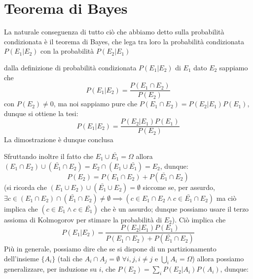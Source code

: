 \documentclass{report}
\begin{document}
\section{Teorema di Bayes}
La naturale conseguenza di tutto ciò che abbiamo detto sulla probabilità condizionata è il teorema di Bayes, che lega tra loro la probabilità condizionata $P(E_1 | E_2)$ con la probabilità $P(E_2 | E_1)$
\begin{myproof}
	dalla definizione di probabilità condizionata $P(E_1 | E_2)$ di $E_1$ dato $E_2$ sappiamo che
	$$
		P(E_1 | E_2) = \frac{P(E_1 \cap E_2)}{P(E_2)}
	$$
	con $P(E_2) \neq 0$, ma noi sappiamo pure che $P(E_1 \cap E_2) = P(E_2 | E_1)P(E_1)$, dunque si ottiene la tesi:
	$$
		P(E_1 | E_2) = \frac{P(E_2 | E_1)P(E_1)}{P(E_2)}
	$$
	La dimostrazione è dunque conclusa
\end{myproof}
\noindent Sfruttando inoltre il fatto che $E_1 \cup \bar{E_1} = \Omega$ allora $(E_1 \cap E_2) \cup (\bar{E_1} \cap E_2) = E_2 \cap (E_1 \cup \bar{E_1}) = E_2$, dunque:
$$
	P(E_2) = P(E_1 \cap E_2) + P(\bar{E_1} \cap E_2)
$$
(si ricorda che $(E_1 \cup E_2) \cup (\bar{E_1} \cup E_2) = \emptyset$ siccome se, per assurdo, $\exists c \in (E_1 \cap E_2) \cap (\bar{E_1} \cap E_2) \neq \emptyset \implies (c \in E_1 \cap E_2  \wedge c \in \bar{E_1} \cap E_2 )$ ma ciò implica che $(c \in E_1 \wedge c \in \bar{E_1})$ che è un assurdo; dunque possiamo usare il terzo assioma di Kolmogorov per stimare la probabilità di $E_2$). Ciò implica che
\begin{equation}
	P(E_1 | E_2) = \frac{P(E_2 | E_1)P(E_1)}{P(E_1 \cap E_2) + P(\bar{E_1} \cap E_2)}
\end{equation}
Più in generale, possiamo dire che se si dispone di un partizionamento dell'insieme $ \{ A_i \} $ (tali che $A_i \cap A_j = \emptyset \, \, \forall i, j, i \neq j$ e $\bigcup\limits_{i} A_i = \Omega$) allora possiamo generalizzare, per induzione su $i$, che $P(E_2) = \sum\limits_{i} P(E_2 | A_i)P(A_i)$, dunque:
\end{document}
